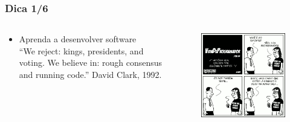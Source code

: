 \begin{frame}
    \frametitle{Dica 1/6}
    \begin{columns}
        \begin{column}{0.6\linewidth}
            \begin{itemize}
                \item Aprenda a desenvolver software \\
                \vspace{1cm}
                {\small
                ``We reject: kings, presidents, and voting. We believe in: rough consensus and running code.'' David Clark, 1992.
                }
            \end{itemize}
        \end{column}
        \begin{column}{0.5\linewidth}
            \begin{figure}
                \centering
                \includegraphics[width=\linewidth]{figs/vida_programador_tirinha169.png}

\end{figure}
\end{column}
\end{columns}
\end{frame}
